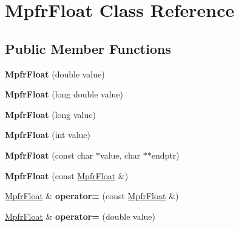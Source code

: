 \hypertarget{class_mpfr_float}{}\section{Mpfr\+Float Class Reference}
\label{class_mpfr_float}
\subsection*{Public Member Functions}
\begin{DoxyCompactItemize}
\item 
\mbox{\label{class_mpfr_float_a984f0977aff05c34e76d3cca363ec6df}} 
{\bfseries Mpfr\+Float} (double value)
\item 
\mbox{\label{class_mpfr_float_a63371995cb8866eb169af680e895ed88}} 
{\bfseries Mpfr\+Float} (long double value)
\item 
\mbox{\label{class_mpfr_float_a69249b46e1caba70b25b4abc1445ba4a}} 
{\bfseries Mpfr\+Float} (long value)
\item 
\mbox{\label{class_mpfr_float_ad6762394f10890f99bf50b18ec55d880}} 
{\bfseries Mpfr\+Float} (int value)
\item 
\mbox{\label{class_mpfr_float_ad90ad26ab3f0a8e135da609af00831c6}} 
{\bfseries Mpfr\+Float} (const char $\ast$value, char $\ast$$\ast$endptr)
\item 
\mbox{\label{class_mpfr_float_a7bf41a6f17f63864d80819c5248c91c4}} 
{\bfseries Mpfr\+Float} (const \hyperlink{class_mpfr_float}{Mpfr\+Float} \&)
\item 
\mbox{\label{class_mpfr_float_a09a52144dd7a440a564180879203e25d}} 
\hyperlink{class_mpfr_float}{Mpfr\+Float} \& {\bfseries operator=} (const \hyperlink{class_mpfr_float}{Mpfr\+Float} \&)
\item 
\mbox{\label{class_mpfr_float_aad79999a57423f0f5bccf0881f62a9d5}} 
\hyperlink{class_mpfr_float}{Mpfr\+Float} \& {\bfseries operator=} (double value)
\item 
\mbox{\label{class_mpfr_float_a64c3e6fc0355299036cae4ba237b4be8}} 
$$
\end{DoxyCompactItemize}
